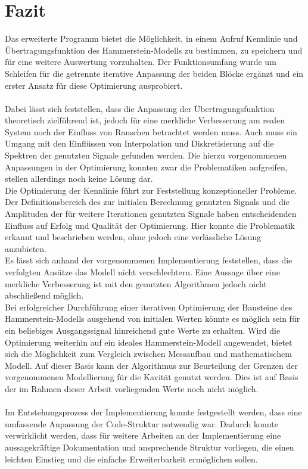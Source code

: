 \documentclass[../Report.tex]{subfiles}
\begin{document}
\chapter{Fazit}
\label{chap:fazit}
Das erweiterte Programm bietet die Möglichkeit, in einem Aufruf Kennlinie und Übertragungsfunktion des Hammerstein-Modells zu bestimmen, zu speichern und für eine weitere Auswertung vorzuhalten.
Der Funktionsumfang wurde um Schleifen für die getrennte iterative Anpassung der beiden Blöcke ergänzt und ein erster Ansatz für diese Optimierung ausprobiert.
\\
\\ 
Dabei lässt sich feststellen, dass die Anpassung der Übertragungsfunktion theoretisch zielführend ist, jedoch für eine merkliche Verbesserung am realen System noch der Einfluss von Rauschen betrachtet werden muss. Auch muss ein Umgang mit den Einflüssen von Interpolation und Diskretisierung auf die Spektren der genutzten Signale gefunden werden. Die hierzu vorgenommenen Anpassungen in der Optimierung konnten zwar die Problematiken aufgreifen, stellen allerdings noch keine Lösung dar.
\\
Die Optimierung der Kennlinie führt zur Feststellung konzeptioneller Probleme. Der Definitionsbereich des zur initialen Berechnung genutzten Signals und die Amplituden der für weitere Iterationen genutzten Signale haben entscheidenden Einfluss auf Erfolg und Qualität der Optimierung. Hier konnte die Problematik erkannt und beschrieben werden, ohne jedoch eine verlässliche Lösung anzubieten. 
\\
Es lässt sich anhand der vorgenommenen Implementierung feststellen, dass die verfolgten Ansätze das Modell nicht verschlechtern. Eine Aussage über eine merkliche Verbesserung ist mit den genutzten Algorithmen jedoch nicht abschließend möglich. 
\\
Bei erfolgreicher Durchführung einer iterativen Optimierung der Bausteine des Hammerstein-Modells ausgehend von initialen Werten könnte es möglich sein für ein beliebiges Ausgangssignal hinreichend gute Werte zu erhalten. Wird die Optimierung weiterhin auf ein ideales Hammerstein-Modell angewendet, bietet sich die Möglichkeit zum Vergleich zwischen Messaufbau und mathematischem Modell. Auf dieser Basis kann der Algorithmus zur Beurteilung der Grenzen der vorgenommenen Modellierung für die Kavität genutzt werden.
Dies ist auf Basis der im Rahmen dieser Arbeit vorliegenden Werte noch nicht möglich. 
\\
\\
Im Entstehungsprozess der Implementierung konnte festgestellt werden, dass eine umfassende Anpassung der Code-Struktur notwendig war. Dadurch konnte verwirklicht werden, dass für weitere Arbeiten an der Implementierung eine aussagekräftige Dokumentation und ansprechende Struktur vorliegen, die einen leichten Einstieg und die einfache Erweiterbarkeit ermöglichen sollen.
\end{document}

